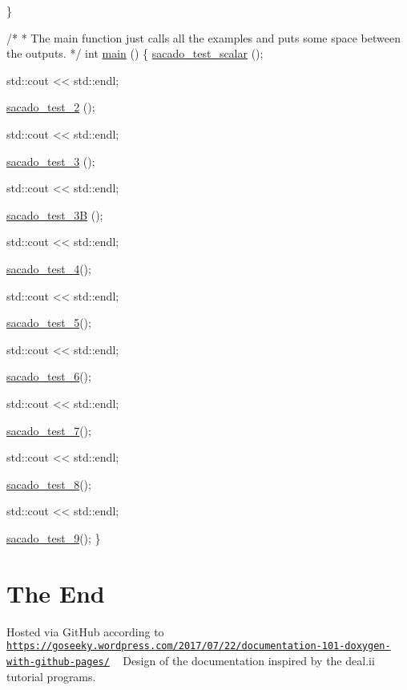 \begin{DoxyCode}
\}
 
 
\textcolor{comment}{/*}
\textcolor{comment}{ * The main function just calls all the examples and puts some space between the outputs.}
\textcolor{comment}{ */}
\textcolor{keywordtype}{int} \hyperlink{example__code__to__be__documented_8cc_ae66f6b31b5ad750f1fe042a706a4e3d4}{main} ()
\{
    \hyperlink{example__code__to__be__documented_8cc_a71b2675e62203edc430e7ffc8a365193}{sacado\_test\_scalar} ();
 
    std::cout << std::endl;
 
    \hyperlink{example__code__to__be__documented_8cc_a8ef4ff1e9526ca8451cdcd1678366d2c}{sacado\_test\_2} ();
 
    std::cout << std::endl;
 
    \hyperlink{example__code__to__be__documented_8cc_ae45e1df0eec246dbb6f2c3d28a2a58e4}{sacado\_test\_3} ();
 
    std::cout << std::endl;
 
    \hyperlink{example__code__to__be__documented_8cc_ae63cc8526935cb0512668e83cfc7b929}{sacado\_test\_3B} ();
 
    std::cout << std::endl;
 
    \hyperlink{example__code__to__be__documented_8cc_a2f4def4563e31d720e07bc7d6363ebe2}{sacado\_test\_4}();
 
    std::cout << std::endl;
 
    \hyperlink{example__code__to__be__documented_8cc_a327dbbb4ea7fc9840c46d149843a44c2}{sacado\_test\_5}();
 
    std::cout << std::endl;
 
    \hyperlink{example__code__to__be__documented_8cc_a27450ab52a9d4250e3f5a5f2a3f8f317}{sacado\_test\_6}();
 
    std::cout << std::endl;
 
    \hyperlink{example__code__to__be__documented_8cc_a0b694459e5e15c1578d97e637faba8de}{sacado\_test\_7}();
 
    std::cout << std::endl;
 
    \hyperlink{example__code__to__be__documented_8cc_aa7108ff8393b98d66dfef50899d048d9}{sacado\_test\_8}();
 
    std::cout << std::endl;
 
    \hyperlink{example__code__to__be__documented_8cc_ae176f83fe1943e102fe325d4a14f097e}{sacado\_test\_9}();
\}
\end{DoxyCode}
\hypertarget{index_END}{}\section{The End}\label{index_END}
Hosted via Git\+Hub according to \href{https://goseeky.wordpress.com/2017/07/22/documentation-101-doxygen-with-github-pages/}{\tt https\+://goseeky.\+wordpress.\+com/2017/07/22/documentation-\/101-\/doxygen-\/with-\/github-\/pages/} ~\newline
Design of the documentation inspired by the deal.\+ii tutorial programs. 